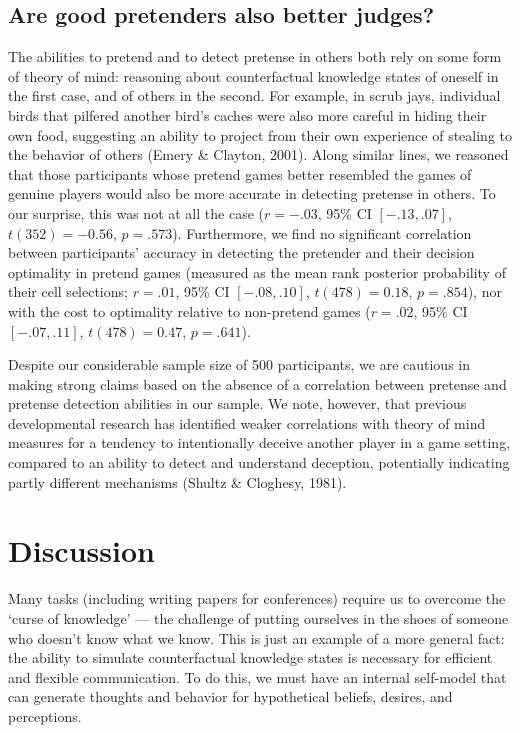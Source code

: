\documentclass[10pt, letterpaper]{article}
\begin{document}
\hypertarget{are-good-pretenders-also-better-judges}{%
\subsection{Are good pretenders also better
judges?}\label{are-good-pretenders-also-better-judges}}

The abilities to pretend and to detect pretense in others both rely on
some form of theory of mind: reasoning about counterfactual knowledge
states of oneself in the first case, and of others in the second. For
example, in scrub jays, individual birds that pilfered another bird's
caches were also more careful in hiding their own food, suggesting an
ability to project from their own experience of stealing to the behavior
of others (Emery \& Clayton, 2001). Along similar lines, we reasoned
that those participants whose pretend games better resembled the games
of genuine players would also be more accurate in detecting pretense in
others. To our surprise, this was not at all the case (\(r = -.03\),
95\% CI \([-.13, .07]\), \(t(352) = -0.56\), \(p = .573\)). Furthermore,
we find no significant correlation between participants' accuracy in
detecting the pretender and their decision optimality in pretend games
(measured as the mean rank posterior probability of their cell
selections; \(r = .01\), 95\% CI \([-.08, .10]\), \(t(478) = 0.18\),
\(p = .854\)), nor with the cost to optimality relative to non-pretend
games (\(r = .02\), 95\% CI \([-.07, .11]\), \(t(478) = 0.47\),
\(p = .641\)).

Despite our considerable sample size of 500 participants, we are
cautious in making strong claims based on the absence of a correlation
between pretense and pretense detection abilities in our sample. We
note, however, that previous developmental research has identified
weaker correlations with theory of mind measures for a tendency to
intentionally deceive another player in a game setting, compared to an
ability to detect and understand deception, potentially indicating
partly different mechanisms (Shultz \& Cloghesy, 1981).

\hypertarget{discussion}{%
\section{Discussion}\label{discussion}}

Many tasks (including writing papers for conferences) require us to
overcome the `curse of knowledge' --- the challenge of putting ourselves
in the shoes of someone who doesn't know what we know. This is just an
example of a more general fact: the ability to simulate counterfactual
knowledge states is necessary for efficient and flexible communication.
To do this, we must have an internal self-model that can generate
thoughts and behavior for hypothetical beliefs, desires, and
perceptions.
\end{document}
